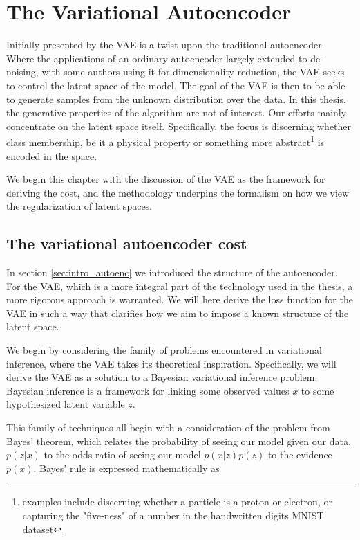 \section{The Variational Autoencoder}\label{sec:vae}

Initially presented by \citet{Kingma2013} the VAE is a twist upon the traditional autoencoder. Where the applications of an ordinary autoencoder largely extended to de-noising, with some authors using it for dimensionality reduction, the VAE seeks to control the latent space of the model. The goal of the VAE is then to be able to generate samples from the unknown distribution over the data. In this thesis, the generative properties of the algorithm are not of interest. Our efforts mainly concentrate on the latent space itself. Specifically, the focus is discerning whether class membership, be it a physical property or something more abstract\footnote{examples include discerning whether a particle is a proton or electron, or capturing the "five-ness" of a number in the handwritten digits MNIST dataset} is encoded in the space.

We begin this chapter with the discussion of the VAE as the framework for deriving the cost, and the methodology underpins the formalism on how we view the regularization of latent spaces.

\subsection{The variational autoencoder cost}

In section \ref{sec:intro_autoenc} we introduced the structure of the autoencoder. For the VAE, which is a more integral part of the technology used in the thesis, a more rigorous approach is warranted. We will here derive the loss function for the VAE in such a way that clarifies how we aim to impose a known structure of the latent space.

We begin by considering the family of problems encountered in variational inference, where the VAE takes its theoretical inspiration. Specifically, we will derive the VAE  as a solution to a Bayesian variational inference problem. Bayesian inference is a framework for linking some observed values $x$ to some hypothesized latent variable $z$. 

This family of techniques all begin with a consideration of the problem from Bayes' theorem, which relates the probability of seeing our model given our data, $p(z|x)$ to the odds ratio of seeing our model $p(x|z)p(z)$ to the evidence $p(x)$. Bayes' rule is expressed mathematically as 

